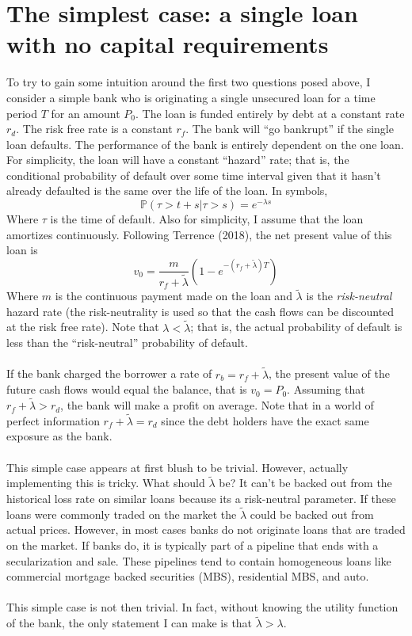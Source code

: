 \documentclass{article}
\begin{document}
\section{The simplest case: a single loan with no capital requirements}

To try to gain some intuition around the first two questions posed above, I consider a simple bank who is originating a single unsecured loan for a time period \(T\) for an amount \(P_0\).  The loan is funded entirely by debt at a constant rate \(r_d\).  The risk free rate is a constant \(r_f\).  The bank will ``go bankrupt'' if the single loan defaults.  The performance of the bank is entirely dependent on the one loan.  For simplicity, the loan will have a constant ``hazard'' rate; that is, the conditional probability of default over some time interval given that it hasn't already defaulted is the same over the life of the loan.  In symbols, 
\[\mathbb{P}(\tau>t+s|\tau>s)=e^{-\lambda s}\]
Where \(\tau\) is the time of default.  Also for simplicity, I assume that the loan amortizes continuously.  Following Terrence (2018), the net present value of this loan is 
\[v_0= \frac{m}{r_f+\tilde{\lambda}}\left(1-e^{-(r_f+\tilde{\lambda})T}\right)\]
Where \(m\) is the continuous payment made on the loan and \(\tilde{\lambda}\) is the \emph{risk-neutral} hazard rate (the risk-neutrality is used so that the cash flows can be discounted at the risk free rate).  Note that \(\lambda<\tilde{\lambda}\); that is, the actual probability of default is less than the ``risk-neutral'' probability of default.  
\\
\\
If the bank charged the borrower a rate of \(r_b=r_f+\tilde{\lambda}\), the present value of the future cash flows would equal the balance, that is \(v_0=P_0\).  Assuming that \(r_f+\tilde{\lambda}>r_d\), the bank will make a profit on average.  Note that in a world of perfect information \(r_f+\tilde{\lambda}=r_d\) since the debt holders have the exact same exposure as the bank.  
\\
\\
This simple case appears at first blush to be trivial.  However, actually implementing this is tricky.  What should \(\tilde{\lambda}\) be?  It can't be backed out from the historical loss rate on similar loans because its a risk-neutral parameter.  If these loans were commonly traded on the market the \(\tilde{\lambda}\) could be backed out from actual prices.  However, in most cases banks do not originate loans that are traded on the market.  If banks do, it is typically part of a pipeline that ends with a secularization and sale.  These pipelines tend to contain homogeneous loans like commercial mortgage backed securities (MBS), residential MBS, and auto.  
\\
\\
This simple case is not then trivial.  In fact, without knowing the utility function of the bank, the only statement I can make is that \(\tilde{\lambda}>\lambda\).
\end{document}
